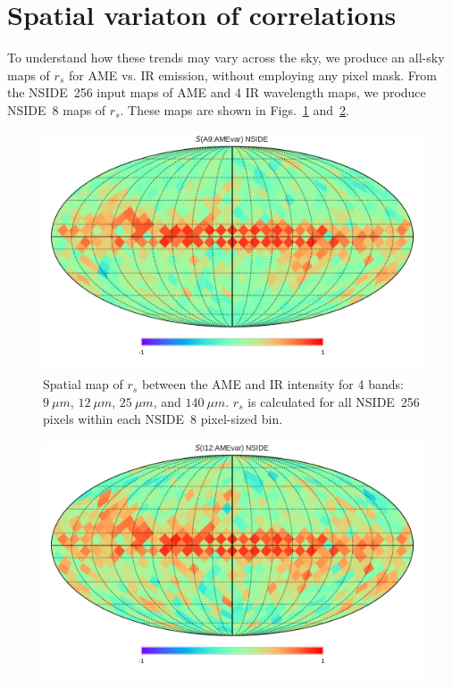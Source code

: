 \section{Spatial variaton of correlations}
    To understand how these trends may vary across the sky, we produce an all-sky maps of $r_{s}$ for AME vs. IR emission, without employing any pixel mask. From the NSIDE~256 input maps of AME and 4 IR wavelength maps, we produce NSIDE~8 maps of $r_{s}$. These maps are shown in Figs.~\ref{fig:Spearman_Map_nside8_AMEtoIR_A9} and~\ref{fig:Spearman_Map_nside8_AMEtoIR_I12}.
      \begin{figure}
        \includegraphics[width=\textwidth]{../Plots/Allsky_Corr/Spearman_Map_nside8_A9toAMEvar.pdf}
        \centering
        \caption{Spatial map of $r_{s}$ between the AME and IR intensity for 4 bands:$9~\mu{}m$, $12~\mu{}m$, $25~\mu{}m$, and $140~\mu{}m$. $r_{s}$ is calculated for all NSIDE~256 pixels within each NSIDE~8 pixel-sized bin.}
        \label{fig:Spearman_Map_nside8_AMEtoIR_A9}
      \end{figure}
      \begin{figure}
        \includegraphics[width=\textwidth]{../Plots/Allsky_Corr/Spearman_Map_nside8_I12toAMEvar.pdf}
        \centering
        \caption{}
        \label{fig:Spearman_Map_nside8_AMEtoIR_I12}
      \end{figure}
